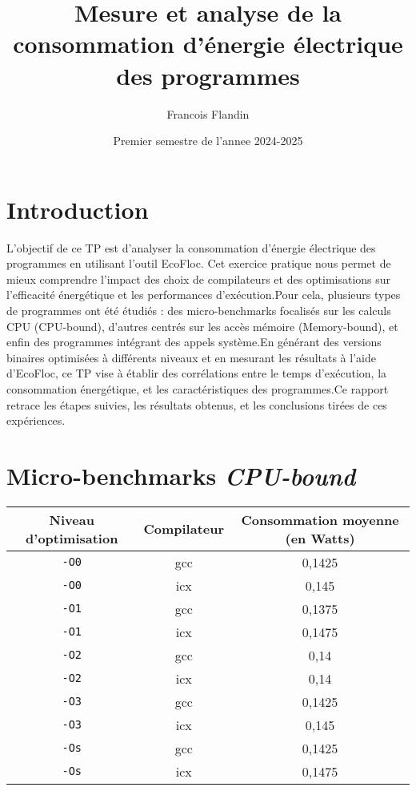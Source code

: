 \documentclass{rapport}
\title{Mesure et analyse de la consommation d’énergie électrique des programmes}
\author{Francois Flandin}
\date{Premier semestre de l'annee 2024-2025}
\begin{document}
    \maketitle
    
    \clearpage
    \tableofcontents
    
    \clearpage
    
    \section{Introduction}
    L’objectif de ce TP est d’analyser la consommation d’énergie électrique des programmes en utilisant l’outil EcoFloc. Cet exercice pratique nous permet de mieux comprendre l’impact des choix de compilateurs et des optimisations sur l’efficacité énergétique et les performances d’exécution.\newline Pour cela, plusieurs types de programmes ont été étudiés : des micro-benchmarks focalisés sur les calculs CPU (CPU-bound), d’autres centrés sur les accès mémoire (Memory-bound), et enfin des programmes intégrant des appels système.\newline En générant des versions binaires optimisées à différents niveaux et en mesurant les résultats à l’aide d’EcoFloc, ce TP vise à établir des corrélations entre le temps d’exécution, la consommation énergétique, et les caractéristiques des programmes.\newline Ce rapport retrace les étapes suivies, les résultats obtenus, et les conclusions tirées de ces expériences.
    
    \section{Micro-benchmarks \textit{CPU-bound}}
    \begin{table}[H]
        \centering
        \begin{tabular}{c|c|c}
         Niveau d'optimisation & Compilateur & Consommation moyenne (en Watts) \\
         \hline
         \texttt{-O0} & gcc & 0,1425 \\
         \texttt{-O0} & icx & 0,145 \\
         \hline
         \texttt{-O1} & gcc & 0,1375 \\
         \texttt{-O1} & icx & 0,1475 \\
         \hline
         \texttt{-O2} & gcc & 0,14 \\
         \texttt{-O2} & icx & 0,14 \\
         \hline
         \texttt{-O3} & gcc & 0,1425 \\
         \texttt{-O3} & icx & 0,145 \\
         \hline
         \texttt{-Os} & gcc & 0,1425 \\
         \texttt{-Os} & icx & 0,1475 \\
        \end{tabular}
    \end{table}
\end{document}
